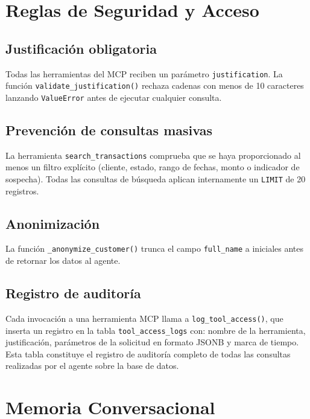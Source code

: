 \documentclass[conference]{IEEEtran}
\begin{document}
\section{Reglas de Seguridad y Acceso}

\subsection{Justificación obligatoria}

Todas las herramientas del MCP reciben un parámetro \texttt{justification}. La función \texttt{validate\_justification()} rechaza cadenas con menos de 10 caracteres lanzando \texttt{ValueError} antes de ejecutar cualquier consulta.

\subsection{Prevención de consultas masivas}

La herramienta \texttt{search\_transactions} comprueba que se haya proporcionado al menos un filtro explícito (cliente, estado, rango de fechas, monto o indicador de sospecha). Todas las consultas de búsqueda aplican internamente un \texttt{LIMIT} de 20 registros.

\subsection{Anonimización}

La función \texttt{\_anonymize\_customer()} trunca el campo \texttt{full\_name} a iniciales antes de retornar los datos al agente.

\subsection{Registro de auditoría}

Cada invocación a una herramienta MCP llama a \texttt{log\_tool\_access()}, que inserta un registro en la tabla \texttt{tool\_access\_logs} con: nombre de la herramienta, justificación, parámetros de la solicitud en formato JSONB y marca de tiempo. Esta tabla constituye el registro de auditoría completo de todas las consultas realizadas por el agente sobre la base de datos.

\section{Memoria Conversacional}
\end{document}
